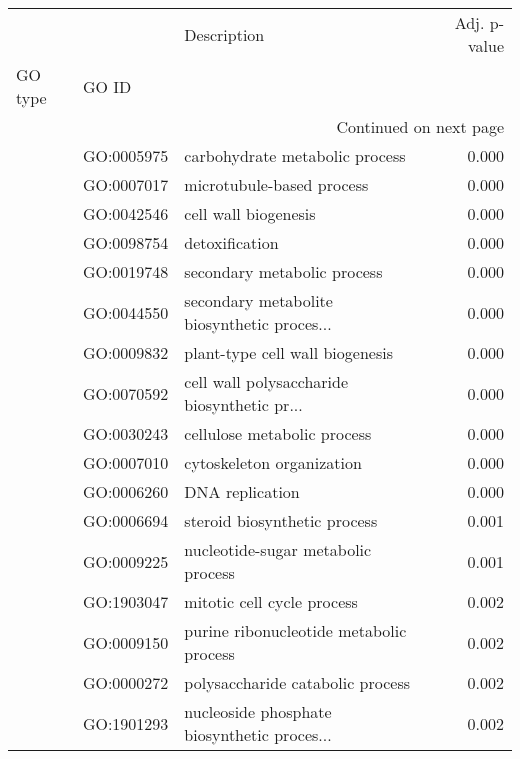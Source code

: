 \begin{longtable}{lllr}
\toprule
   &            &                                  Description &  Adj. p-value \\
GO type & GO ID &                                              &               \\
\midrule
\endhead
\midrule
\multicolumn{4}{r}{{Continued on next page}} \\
\midrule
\endfoot

\bottomrule
\endlastfoot
\multirow{146}{*}{BP} & GO:0005975 &               carbohydrate metabolic process &         0.000 \\
   & GO:0007017 &                    microtubule-based process &         0.000 \\
   & GO:0042546 &                         cell wall biogenesis &         0.000 \\
   & GO:0098754 &                               detoxification &         0.000 \\
   & GO:0019748 &                  secondary metabolic process &         0.000 \\
   & GO:0044550 &  secondary metabolite biosynthetic proces... &         0.000 \\
   & GO:0009832 &              plant-type cell wall biogenesis &         0.000 \\
   & GO:0070592 &  cell wall polysaccharide biosynthetic pr... &         0.000 \\
   & GO:0030243 &                  cellulose metabolic process &         0.000 \\
   & GO:0007010 &                    cytoskeleton organization &         0.000 \\
   & GO:0006260 &                              DNA replication &         0.000 \\
   & GO:0006694 &                 steroid biosynthetic process &         0.001 \\
   & GO:0009225 &           nucleotide-sugar metabolic process &         0.001 \\
   & GO:1903047 &                   mitotic cell cycle process &         0.002 \\
   & GO:0009150 &      purine ribonucleotide metabolic process &         0.002 \\
   & GO:0000272 &             polysaccharide catabolic process &         0.002 \\
   & GO:1901293 &  nucleoside phosphate biosynthetic proces... &         0.002 \\

\end{longtable}
